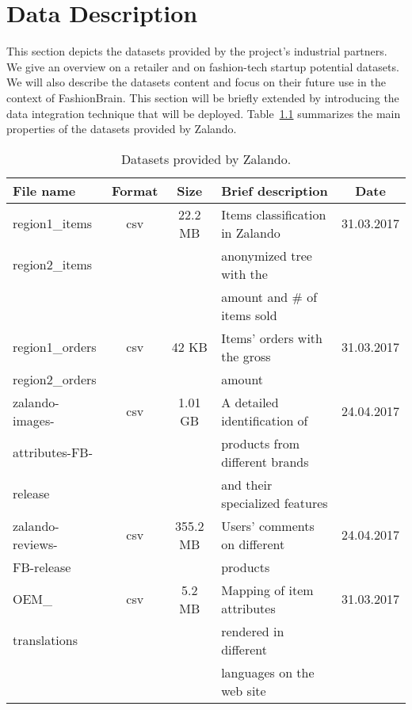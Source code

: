 \chapter{Data Description}
\label{chap:ddesc}

This section depicts the datasets provided by the project’s industrial partners. We give an overview on a retailer and on fashion-tech startup potential datasets. We will also describe the datasets content and focus on their future use in the context of FashionBrain. This section will be briefly extended by introducing the data integration technique that will be deployed. Table~\ref{tab:data-zalando} summarizes the main properties of the datasets provided by Zalando.
\smallskip


\begin{table}[htb]\centering
\def\arraystretch{1.2}
\begin{tabular}{|l|c|c|l|c|}
\hline
 \textbf{File name} & \textbf{Format}  &  \textbf{Size} & \textbf{Brief description} & \textbf{Date} \\
 \hline\hline
 region1\_items & csv  &22.2 MB  &Items classification in Zalando &  31.03.2017  \\
 region2\_items &  &  &anonymized tree with the & \\
 &  &  & amount and \# of items sold  &  \\
 \hline
 region1\_orders & csv  &42 KB  &Items’ orders with the gross  &  31.03.2017  \\
 region2\_orders &  &  &amount  & \\
 \hline
zalando-images- & csv  &1.01 GB  &A detailed identification of  &  24.04.2017  \\
attributes-FB- &  &  &products from different brands& \\
release&  &  & and their specialized features  &  \\
 \hline
zalando-reviews- & csv  &355.2 MB  &Users’ comments on different  &  24.04.2017  \\
FB-release&  &  & products& \\
 \hline
OEM\_ & csv  &5.2 MB  &Mapping of item attributes &  31.03.2017  \\
translations&  &  & rendered in different  & \\
&  &  &  languages on the web site & \\
 \hline
\end{tabular}
\caption{Datasets provided by Zalando.}
\label{tab:data-zalando}
\end{table}
\smallskip


